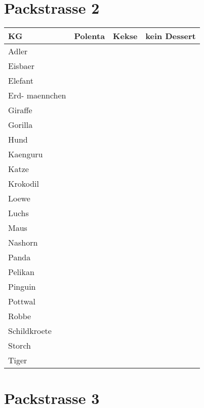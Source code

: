 \documentclass[14pt]{article}
\begin{document}
\section{Packstrasse 2}

\begin{tabular}{l|l|l|l}
  \toprule
  KG  &Polenta&Kekse&kein Dessert\\
  \midrule


Adler&&&\\


Eisbaer&&&\\


Elefant&&&\\


Erd-
maennchen&&&\\


Giraffe&&&\\


Gorilla&&&\\


Hund&&&\\


Kaenguru&&&\\


Katze&&&\\


Krokodil&&&\\


Loewe&&&\\


Luchs&&&\\


Maus&&&\\


Nashorn&&&\\


Panda&&&\\


Pelikan&&&\\


Pinguin&&&\\


Pottwal&&&\\


Robbe&&&\\


Schildkroete&&&\\


Storch&&&\\


Tiger&&&\\
\end{tabular}
\newpage
\section{Packstrasse 3}
\end{document}
